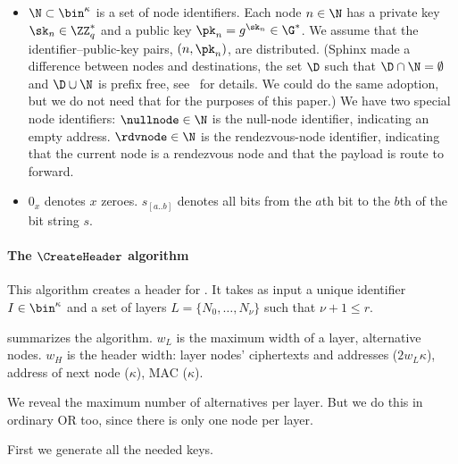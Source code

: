 \begin{itemize}
  \item \(\N\subset \bin^\kappa\) is a set of node identifiers.
    Each node \(n\in \N\) has a private key \(\sk_n\in \ZZ_q^*\) and a public 
    key \(\pk_n = g^{\sk_n}\in \G^*\).
    We assume that the identifier--public-key pairs, \((n, \pk_n)\), are 
    distributed.
    (Sphinx made a difference between nodes and destinations, \ie the set 
    \(\D\) such that \(\D\cap \N = \emptyset\) and \(\D\cup \N\) is prefix 
    free, see~\cite{Sphinx} for details.
    We could do the same adoption, but we do not need that for the purposes of 
    this paper.)
    We have two special node identifiers:
    \(\nullnode\in \N\) is the null-node identifier, indicating an empty 
    address.
    \(\rdvnode\in \N\) is the rendezvous-node identifier, indicating that the 
    current node is a rendezvous node and that the payload is  route 
    to forward.

  \item \(0_x\) denotes \(x\) zeroes.
    \(s_{[a..b]}\) denotes all bits from the \(a\)th bit to the \(b\)th of the 
    bit string \(s\).
\end{itemize}

\paragraph*{The \(\CreateHeader\) algorithm}


This algorithm creates a header for .
It takes as input a unique identifier \(I\in \bin^\kappa\) and a set of layers 
\(L = \{N_0, \dotsc, N_\nu\}\) such that \(\nu+1\leq r\).

 summarizes the algorithm.
\(w_L\) is the maximum width of a layer, \ie alternative nodes.
\(w_H\) is the header width:
layer nodes' ciphertexts and addresses ($2w_L\kappa$),
address of next node ($\kappa$),
\ac{MAC} ($\kappa$).

We reveal the maximum number of alternatives per layer.
But we do this in ordinary \ac{OR} too, since there is only one node per layer.

First we generate all the needed keys.

